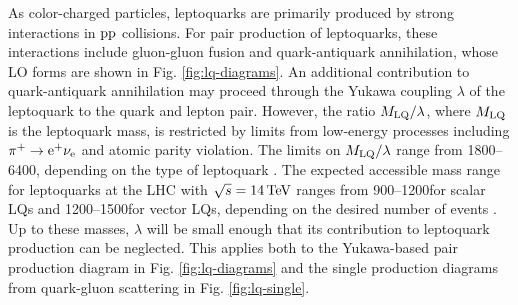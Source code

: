 As color-charged particles, leptoquarks are primarily produced by strong interactions in $\mathrm{p}\mathrm{p}$ collisions. For pair production of leptoquarks, these interactions include gluon-gluon fusion and quark-antiquark annihilation, whose LO forms are shown in Fig. \ref{fig:lq-diagrams}. An additional contribution to quark-antiquark annihilation may proceed through the Yukawa coupling $\lambda$ of the leptoquark to the quark and lepton pair. However, the ratio $M_{\text{LQ}}/\lambda$, where $M_{\text{LQ}}$ is the leptoquark mass, is restricted by limits from low-energy processes including $\pi^{+} \rightarrow \mathrm{e}^{+} \nu_{\mathrm{e}}$ and atomic parity violation. The limits on $M_{\text{LQ}}/\lambda$ range from 1800--6400\GeVcc, depending on the type of leptoquark \cite{Leurer:1993em, MuchAdo, LQreview}. The expected accessible mass range for leptoquarks at the LHC with $\sqrt{s}=14\,\text{Te\hspace{-.08em}V}$ ranges from 900--1200\GeVcc for scalar LQs and 1200--1500\GeVcc for vector LQs, depending on the desired number of events \cite{LQPairHad}. Up to these masses, $\lambda$ will be small enough that its contribution to leptoquark production can be neglected. This applies both to the Yukawa-based pair production diagram in Fig. \ref{fig:lq-diagrams} and the single production diagrams from quark-gluon scattering in Fig. \ref{fig:lq-single}.

